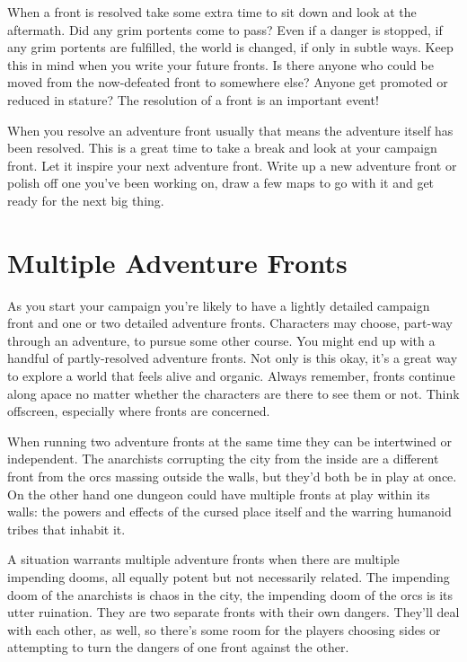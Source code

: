 When a front is resolved take some extra time to sit down and look at the aftermath. Did any grim portents come to pass? Even if a danger is stopped, if any grim portents are fulfilled, the world is changed, if only in subtle ways. Keep this in mind when you write your future fronts. Is there anyone who could be moved from the now-defeated front to somewhere else? Anyone get promoted or reduced in stature? The resolution of a front is an important event!


When you resolve an adventure front usually that means the adventure itself has been resolved. This is a great time to take a break and look at your campaign front. Let it inspire your next adventure front. Write up a new adventure front or polish off one you've been working on, draw a few maps to go with it and get ready for the next big thing.
\section*{Multiple Adventure Fronts}


As you start your campaign you're likely to have a lightly detailed campaign front and one or two detailed adventure fronts. Characters may choose, part-way through an adventure, to pursue some other course. You might end up with a handful of partly-resolved adventure fronts. Not only is this okay, it's a great way to explore a world that feels alive and organic. Always remember, fronts continue along apace no matter whether the characters are there to see them or not. Think offscreen, especially where fronts are concerned.


When running two adventure fronts at the same time they can be intertwined or independent. The anarchists corrupting the city from the inside are a different front from the orcs massing outside the walls, but they'd both be in play at once. On the other hand one dungeon could have multiple fronts at play within its walls: the powers and effects of the cursed place itself and the warring humanoid tribes that inhabit it.


A situation warrants multiple adventure fronts when there are multiple impending dooms, all equally potent but not necessarily related. The impending doom of the anarchists is chaos in the city, the impending doom of the orcs is its utter ruination. They are two separate fronts with their own dangers. They'll deal with each other, as well, so there's some room for the players choosing sides or attempting to turn the dangers of one front against the other.


